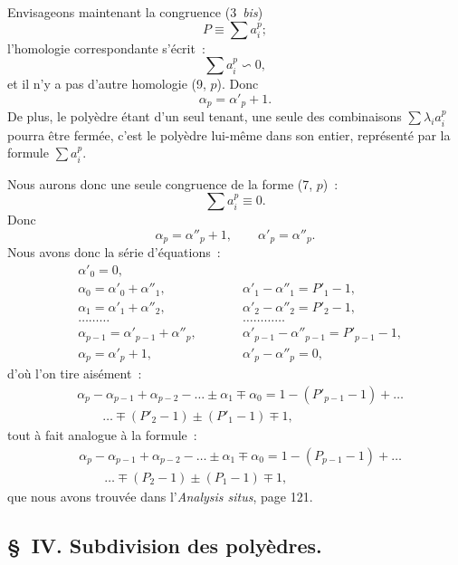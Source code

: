 \documentclass{article}
\begin{document}
Envisageons maintenant la congruence (3~\emph{bis})
\[ P \equiv \sum a^{p}_{i}; \]
l'homologie correspondante s'écrit~:
\[ \sum a^{p}_{i} \backsim 0, \]
et il n'y a pas d'autre homologie (9, $p$). Donc
\[ \alpha_{p} = \alpha'_{p} + 1. \]
De plus, le polyèdre étant d'un seul tenant, une seule des combinaisons $\displaystyle\sum \lambda_{i} a^{p}_{i}$ pourra être fermée, c'est le polyèdre lui-même dans son entier, représenté par la formule $\displaystyle\sum a^{p}_{i}$.

Nous aurons donc une seule congruence de la forme (7, $p$)~:
\[ \sum a^{p}_{i} \equiv 0. \]
Donc
\[ \alpha_{p} = \alpha''_{p} + 1, \qquad \alpha'_{p} = \alpha''_{p}. \]
Nous avons donc la série d'équations~:
\[ \begin{aligned} &\alpha'_{0} = 0, \\ &\alpha_{0} = \alpha'_{0} + \alpha''_{1}, &&\qquad \alpha'_{1} - \alpha''_{1} = P'_{1} - 1, \\ &\alpha_{1} = \alpha'_{1} + \alpha''_{2}, &&\qquad \alpha'_{2} - \alpha''_{2} = P'_{2} - 1, \\ &\ldots\ldots\ldots &&\qquad \ldots\ldots\ldots\ldots \\ &\alpha_{p-1} = \alpha'_{p-1} + \alpha''_{p}, &&\qquad \alpha'_{p-1} - \alpha''_{p-1} = P'_{p-1} - 1, \\ &\alpha_{p} = \alpha'_{p} + 1, &&\qquad \alpha'_{p} - \alpha''_{p} = 0, \end{aligned} \]
d'où l'on tire aisément~:
\[ \begin{aligned} &\alpha_{p} - \alpha_{p-1} + \alpha_{p-2} - \ldots \pm \alpha_{1} \mp \alpha_{0} = 1 - (P'_{p-1} - 1) + \ldots \\ &\qquad \ldots \mp (P'_{2} - 1) \pm (P'_{1} - 1) \mp 1, \end{aligned} \]
tout à fait analogue à la formule~:
\[ \begin{aligned} &\alpha_{p} - \alpha_{p-1} + \alpha_{p-2} - \ldots \pm \alpha_{1} \mp \alpha_{0} = 1 - (P_{p-1} - 1) + \ldots \\ &\qquad \ldots \mp (P_{2} - 1) \pm (P_{1} - 1) \mp 1, \end{aligned} \]
que nous avons trouvée dans l'\emph{Analysis situs}, page 121.

\subsection*{\S~IV. Subdivision des polyèdres.}
\end{document}
